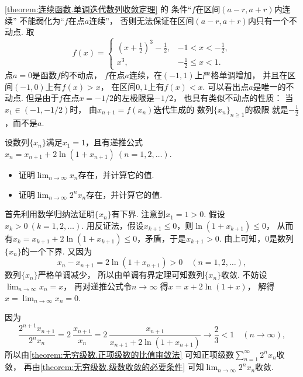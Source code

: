 \begin{remark}
\cref{theorem:连续函数.单调迭代数列收敛定理} 的
条件“\(f\)在区间\((a-r,a+r)\)内连续”
不能弱化为“\(f\)在点\(a\)连续”，
否则无法保证在区间\((a-r,a+r)\)内只有一个不动点.
取\begin{equation*}
	f(x) = \left\{ \begin{array}{cc}
		\left( x + \frac12 \right)^3 - \frac12, & -1 < x < -\frac12, \\
		x^3, & -\frac12 \leq x < 1.
	\end{array} \right.
\end{equation*}
点\(a=0\)是函数\(f\)的不动点，
\(f\)在点\(a\)连续，在\((-1,1)\)上严格单调增加，
并且在区间\((-1,0)\)上有\(f(x)>x\)，
在区间\(0,1\)上有\(f(x)<x\).
可以看出点\(a\)是唯一的不动点.
但是由于\(f\)在点\(x=-1/2\)的左极限是\(-1/2\)，
也具有类似不动点的性质：
当\(x_1 \in (-1,-1/2)\)时，
由\(x_{n+1} = f(x_n)\)迭代生成的
数列\(\{x_n\}_{n\geq1}\)的极限
就是\(-\frac12\)，而不是\(a\).
\end{remark}

\begin{example}
设数列\(\{x_n\}\)满足\(x_1=1\)，且有递推公式\(x_n=x_{n+1}+2\ln(1+x_{n+1})\ (n=1,2,\dotsc)\).
\begin{itemize}
	\item 证明\(\lim_{n\to\infty} x_n\)存在，并计算它的值.
	\item 证明\(\lim_{n\to\infty} 2^n x_n\)存在，并计算它的值.
\end{itemize}
\begin{solution}
首先利用数学归纳法证明\(\{x_n\}\)有下界.
注意到\(x_1=1>0\).
假设\(x_k>0\ (k=1,2,\dotsc)\).
用反证法，假设\(x_{k+1}\leq0\)，则\(\ln(1+x_{k+1})\leq0\)，
从而有\(x_k=x_{k+1}+2\ln(1+x_{k+1})\leq0\)，矛盾，于是\(x_{k+1}>0\).
由上可知，\(0\)是数列\(\{x_n\}\)的一个下界.
又因为\begin{equation*}
	x_n-x_{n+1}=2\ln(1+x_{n+1})>0
	\quad(n=1,2,\dotsc),
\end{equation*}
数列\(\{x_n\}\)严格单调减少，
所以由单调有界定理可知数列\(\{x_n\}\)收敛.
不妨设\(\lim_{n\to\infty} x_n = x\)，
再对递推公式令\(n\to\infty\)
得\(x=x+2\ln(1+x)\)，
解得\(x = \lim_{n\to\infty} x_n = 0\).

因为\begin{equation*}
	\frac{2^{n+1} x_{n+1}}{2^n x_n}
	= 2~\frac{x_{n+1}}{x_n} %
	= 2~\frac{x_{n+1}}{x_{n+1}+2\ln(1+x_{n+1})} %
	\to \frac23 < 1
	\quad(n\to\infty),
\end{equation*}
所以由\cref{theorem:无穷级数.正项级数的比值审敛法}
可知正项级数\(\sum_{n=1}^\infty 2^n x_n\)收敛，
再由\cref{theorem:无穷级数.级数收敛的必要条件}
可知\(\lim_{n\to\infty} 2^n x_n\)收敛.
\end{solution}
\end{example}

